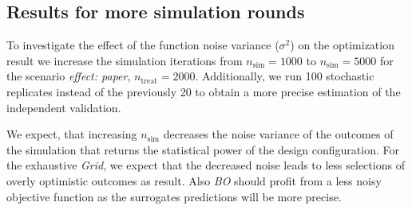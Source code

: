 \documentclass[bimj,fleqn]{w-art}
\theoremstyle{plain}
\theoremstyle{definition}
\begin{document}
\subsection{Results for more simulation rounds}

To investigate the effect of the function noise variance ($\sigma^2$) on the optimization result we increase the simulation iterations from $n_\text{sim} = 1000$ to $n_\text{sim} = 5000$ for the scenario \emph{effect: paper}, $n_{\text{treat}} = 2000$.
Additionally, we run 100 stochastic replicates instead of the previously 20 to obtain a more precise estimation of the independent validation.

We expect, that increasing $n_\text{sim}$ decreases the noise variance of the outcomes of the simulation that returns the statistical power of the design configuration.
For the exhaustive \emph{Grid}, we expect that the decreased noise leads to less selections of overly optimistic outcomes as result.
Also \emph{BO} should profit from a less noisy objective function as the surrogates predictions will be more precise.
\end{document}
